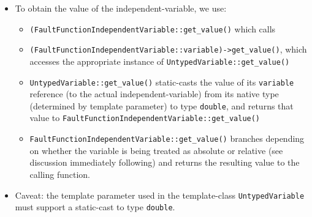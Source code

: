 \documentclass[11pt,fleqn]{report}
\begin{document}
\begin{itemize}
\begin{itemize}
        the simulation. This independent-variable is passed as the argument to
        \verb'FaultFunctionIndependentVariable::initialize(T &)') and from there
        is passed as the argument to the constructor of the new
        \verb'UntypedVariable' instance. \verb'UntypedVariable' can support a
        reference to the
        independent-variable because the details (type and address) of the
        independent-variable are both known at the construction of the new
        \verb'UntypedVariable'.
      \item the memory-address of the new instance of
        \verb'UntypedVariable' is not particularly important, and it certainly
        does not have to be contiguous with the fault. We do need to maintain
        access to this new instance; its address is recorded as the
        \verb"variable" pointer found
        in \verb"FaultFunctionIndependentVariable".
    \end{itemize}
    \item To obtain the value of the independent-variable, we use:
      \begin{itemize}
        \item \verb'(FaultFunctionIndependentVariable::get_value()' which calls
        \item \verb'(FaultFunctionIndependentVariable::variable)->get_value()',
          which accesses the appropriate instance of
          \verb'UntypedVariable::get_value()'
        \item \verb'UntypedVariable::get_value()' static-casts the value
          of its \verb'variable' reference (to the actual independent-variable)
          from its native type (determined by template parameter) to type
          \verb'double', and returns that value to \newline
          \verb'FaultFunctionIndependentVariable::get_value()'
        \item \verb'FaultFunctionIndependentVariable::get_value()' branches
          depending on
          whether the variable is being treated as absolute or relative (see
          discussion immediately following) and returns the resulting value to
          the calling function.
      \end{itemize}
    \item Caveat: the template parameter used in the template-class
      \verb'UntypedVariable' must support a static-cast to type \verb'double'.
\end{itemize}
\end{document}

